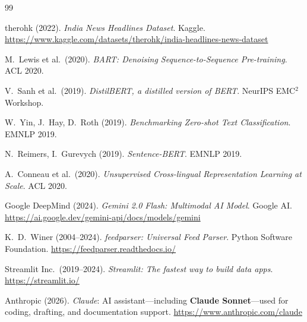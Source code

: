\documentclass[11pt,a4paper]{article}
\begin{document}
\begin{thebibliography}{99}

therohk (2022). \textit{India News Headlines Dataset}. Kaggle.
\url{https://www.kaggle.com/datasets/therohk/india-headlines-news-dataset}

M.\ Lewis et al.\ (2020). \textit{BART: Denoising Sequence-to-Sequence Pre-training}. ACL 2020.

V.\ Sanh et al.\ (2019). \textit{DistilBERT, a distilled version of BERT}. NeurIPS EMC$^2$ Workshop.

W.\ Yin, J.\ Hay, D.\ Roth (2019). \textit{Benchmarking Zero-shot Text Classification}. EMNLP 2019.

N.\ Reimers, I.\ Gurevych (2019). \textit{Sentence-BERT}. EMNLP 2019.

A.\ Conneau et al.\ (2020). \textit{Unsupervised Cross-lingual Representation Learning at Scale}. ACL 2020.

Google DeepMind (2024). \textit{Gemini 2.0 Flash: Multimodal AI Model}. Google AI.
\url{https://ai.google.dev/gemini-api/docs/models/gemini}

K.\ D.\ Winer (2004--2024). \textit{feedparser: Universal Feed Parser}. Python Software Foundation.
\url{https://feedparser.readthedocs.io/}

Streamlit Inc.\ (2019--2024). \textit{Streamlit: The fastest way to build data apps}. 
\url{https://streamlit.io/}

Anthropic (2026). \textit{Claude}: AI assistant—including \textbf{Claude Sonnet}—used for coding, drafting, and documentation support.
\url{https://www.anthropic.com/claude}

\end{thebibliography}
\end{document}
